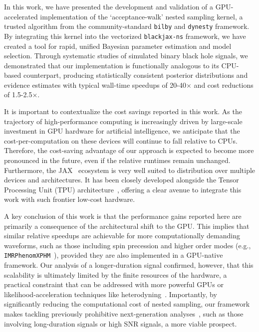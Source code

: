 \documentclass[fleqn,usenatbib]{mnras}
\begin{document}
In this work, we have presented the development and validation of a
GPU-accelerated implementation of the `acceptance-walk' nested sampling
kernel, a trusted algorithm from the community-standard \texttt{bilby}
and \texttt{dynesty} framework. By integrating this kernel into the
vectorized \texttt{blackjax-ns} framework, we have created a tool for
rapid, unified Bayesian parameter estimation and model selection.
Through systematic studies of simulated binary black hole signals, we
demonstrated that our implementation is functionally analogous to its
CPU-based counterpart, producing statistically consistent posterior
distributions and evidence estimates with typical wall-time speedups of
20-40$\times$ and cost reductions of 1.5-2.5$\times$.

It is important to contextualize the cost savings reported in this
work. As the trajectory of
high-performance computing is increasingly driven by large-scale
investment in GPU hardware for artificial intelligence, we
anticipate that the cost-per-computation on these devices will continue
to fall relative to CPUs. Therefore, the cost-saving advantage of our
approach is expected to become more pronounced in the future, even
if the relative runtimes remain unchanged. 
Furthermore, the JAX~\citep{jax2018github} ecosystem is very well 
suited to distribution over multiple devices and 
architectures. It has been closely developed alongside the 
Tensor Processing Unit (TPU) architecture~\citep{jouppi2023tpu}, 
offering a clear avenue to integrate this work with such 
frontier low-cost hardware.

A key conclusion of this work is that the performance gains 
reported here are primarily a consequence
of the architectural shift to the GPU. This implies that similar relative
speedups are achievable for more computationally demanding waveforms,
such as those including spin precession and higher order modes (e.g., 
\texttt{IMRPhenomXPHM}~\citep{IMRPhenomXPHM}), provided they are also
implemented in a GPU-native framework. Our analysis of a longer-duration
signal confirmed, however, that this scalability is ultimately limited
by the finite resources of the hardware, a practical constraint that can
be addressed with more powerful GPUs or likelihood-acceleration techniques
like heterodyning~\citep{TL_relativebinning,relativebinning2,relativebinning3,relativebinning4}.
Importantly, by significantly reducing the computational cost
of nested sampling, our framework makes tackling previously prohibitive
next-generation analyses~\citep{HuAccelerationReview, makaibaker2025}, 
such as those involving long-duration
signals or high SNR signals, a more viable prospect.
\end{document}
